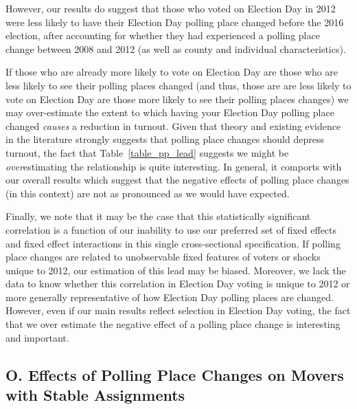 \documentclass{cup_PSRM}
\begin{document}
However, our results do suggest that those who voted on Election Day in 2012 were less likely to have their Election Day polling place changed before the 2016 election, after accounting for whether they had experienced a polling place change between 2008 and 2012 (as well as county and individual characteristics).

If those who are already more likely to vote on Election Day are those who are less likely to see their polling places changed (and thus, those are are less likely to vote on Election Day are those more likely to see their polling places changes) we may over-estimate the extent to which having your Election Day polling place changed \emph{causes} a reduction in turnout.  Given that theory and existing evidence in the literature strongly suggests that polling place changes should depress turnout, the fact that Table~\ref{table_pp_lead} suggests we might be \emph{over}estimating the relationship is quite interesting.  In general, it comports with our overall results which suggest that the negative effects of polling place changes (in this context) are not as pronounced as we would have expected.

Finally, we note that it may be the case that this statistically significant correlation is a function of our inability to use our preferred set of fixed effects and fixed effect interactions in this single cross-sectional specification.  If polling place changes are related to unobservable fixed features of voters or shocks unique to 2012, our estimation of this lead may be biased.  Moreover, we lack the data to know whether this correlation in Election Day voting is unique to 2012 or more generally representative of how Election Day polling places are changed.  However, even if our main results reflect selection in Election Day voting, the fact that we over estimate the negative effect of a polling place change is interesting and important.






\clearpage \newpage
\subsection{O. Effects of Polling Place Changes on Movers with Stable Assignments}\label{appendix_movers_w_same_assignments}
\setcounter{table}{0}
\setcounter{figure}{0}
\renewcommand{\thetable}{O\arabic{table}}
\renewcommand{\thefigure}{O\arabic{figure}}
\end{document}
